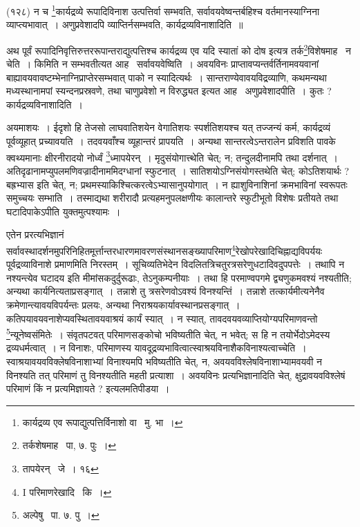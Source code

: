 \documentclass[11pt, openany]{book}
\begin{document}
{{\knu (१२८) न च \renewcommand{\thefootnote}{3}\footnote{कार्यद्रव्य एव रूपाद्युत्पत्तिर्विनाशो वा \textendash\ मु. भा~।}कार्यद्रव्ये रूपादिविनाश उत्पत्तिर्वा सम्भवति, सर्वावयवेष्वन्तर्बहिश्च वर्तमानस्याग्निना व्याप्त्यभावात्~। अणुप्रवेशादपि व्याप्तिर्नसम्भवति, कार्यद्रव्यविनाशादिति~॥}

अथ पूर्वं रूपादिनिवृत्तिरुत्तररूपान्तराद्युत्पत्तिश्च कार्यद्रव्य एव यदि स्यातां को दोष इत्यत्र तर्क\renewcommand{\thefootnote}{4}\footnote{तर्कशेषमाह \textendash\ पा, ७. पुः~।}विशेषमाह \textendash\ {\knu न चेति~।} किमिति न सम्भवतीत्यत आह \textendash\ {\knu सर्वावयवेष्विति~।} अवयविनः प्राप्तावप्यन्तर्वर्तिनामवयवानां बाह्यावयवावष्टम्भेनाग्निप्राप्तेरसम्भवात् पाको न स्यादित्यर्थः~। सान्तराण्येवावयविद्रव्याणि, कथमन्यथा मध्यस्थानामपां स्यन्दनप्रस्रवणे, तथा चाणुप्रवेशो न विरुद्ध्यत इत्यत आह \textendash\ {\knu अणुप्रवेशादपीति~।} कुतः ? {\knu कार्यद्रव्यविनाशादिति~।}

अयमाशयः~। ईदृशो हि तेजसो लाघवातिशयेन वेगातिशयः स्पर्शतिशयश्च यत् तज्जन्यं कर्म, कार्यद्रव्यं पूर्वव्यूहात् प्रच्यावयति~। तदवयवाँश्च व्यूहान्तरं प्रापयति~। अन्यथा सान्तरत्वेऽन्तरालेन प्रविशति पावके क्वथ्यमानाः क्षीरनीरादयो नोर्ध्वं \renewcommand{\thefootnote}{5}\footnote{तापयेरन् \textendash\ जे~। १६}ध्मापयेरन्~। मृदुसंयोगात्त्थेति चेत्; न; तन्दुलदीनामपि तथा दर्शनात्~। अतिदृढानामप्युपलमणिवज्रादीनाममिदग्धानां स्फुटनात्~। सातिशयोऽग्निसंयोगस्तथेति चेत्; कोऽतिशयार्थः ? बह्रभ्यास इति चेत्, न; प्रथमस्याकिश्चित्करत्वेऽभ्यासानुपयोगात्~। न ह्याशुविनाशिनां क्रमभाविनां स्वरूपतः समुच्चयः सम्भाति~। तस्माद्यथा शरीरादौ प्रत्यहमनुपलक्षणीयः कालान्तरे स्फुटीभूतो विशेषः प्रतीयते तथा घटादिपाकेऽपीति युक्तमुत्पश्यामः~।

\newpage
एतेन प्ररत्यभिज्ञानं सर्वावस्थादर्शनमुपरिनिहितमूर्त्तान्तरधारणमावरणसंस्थानसङ्ख्यापरिमाण\renewcommand{\thefootnote}{1}\footnote{I परिमाणरेखादि \textendash\ कि~।}रेखोपरेखादिचिह्नाद्यविपर्ययः पूर्वद्रव्याविनाशे प्रमाणमिति निरस्तम्~। सूचिव्यतिभेदेन विदलितत्रिचतुरत्रसरेणुधटादिवदुपपत्तेः~। तथापि न नश्यन्त्येव घटादय इति {\knu मीमांसक}दुर्दुरूढाः, तेऽनुकम्पनीयाः~। तथा हि परमाण्वपगमे द्व्यणुकमवश्यं नश्यतीति; अन्यथा कार्यनित्यताप्रसङ्गात्~। तन्नाशे तु त्रसरेणवोऽवश्यं विनश्यन्तिं~। तन्नाशे तत्कार्यमीत्यनेनैव क्रमेणान्त्यावयविपर्यन्तः प्रलयः, अन्यथा निराश्रयकार्यावस्थानप्रसङ्गात्~। कतिपयावयवनाशेप्यवस्थितावयवाश्रयं कार्यं स्यात्~। न स्यात्, तावदवयवव्याप्तियोग्यपरिमाणवन्तो \renewcommand{\thefootnote}{2}\footnote{अल्पेषु \textendash\ पा. ७. पु~।}न्यूनेष्वसंमितेः~। संवृतपटवत् परिमाणसङ्कोचो भविष्यतीति चेत्, न भवेत्; स हि न तयोर्भेदोऽमेदस्य द्रव्यधर्मत्वात्~। न विनाशः, परिमाणस्य यावदूद्रव्यभावित्वात्स्वाश्रयविनाशैकविनाश्यत्वाच्चेति~। स्वाश्रयावयवविक्लेषविनाशाभ्यां विनाश्यमपि भविष्यतीति चेत्, न, अवयवविश्लेषविनाशाभ्यामवयवी न विनश्यति तत् परिमाणं तु विनश्यतीति महती प्रत्याशा~। अवयविनः प्रत्यभिज्ञानादिति चेत्, क्षुद्रावयवविश्लेषं परिमाणं किं न प्रत्यमिज्ञायते ? इत्यलमतिपीडया~।

}
\end{document}
